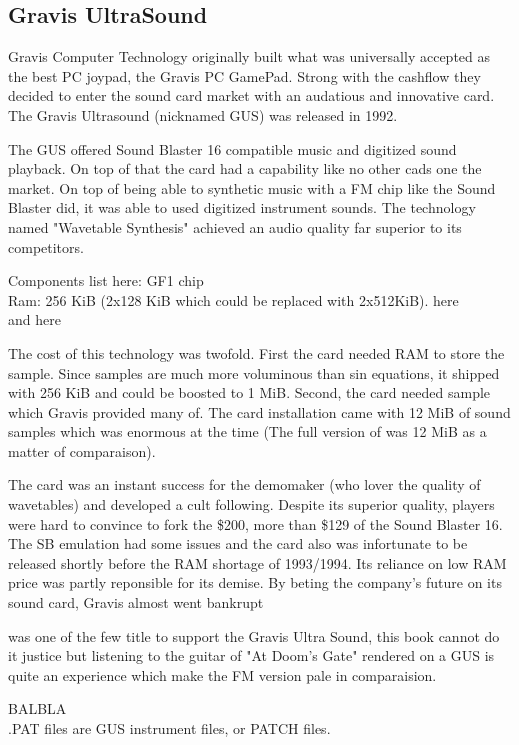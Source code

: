 \subsection{Gravis UltraSound}
Gravis Computer Technology originally built what was universally accepted as the best PC joypad, the Gravis PC GamePad. Strong with the cashflow they decided to enter the sound card market with an audatious and innovative card. The Gravis Ultrasound (nicknamed GUS) was released in 1992.\\
\par
The GUS offered Sound Blaster 16 compatible music and digitized sound playback. On top of that the card had a capability like no other cads one the market. On top of being able to synthetic music with a FM chip like the Sound Blaster did, it was able to used digitized instrument sounds. The technology named "Wavetable Synthesis" achieved an audio quality far superior to its competitors.\\
\par
{}
\par
Components list here: GF1 chip\\
Ram: 256 KiB (2x128 KiB which could be replaced with 2x512KiB). here\\
and here\\
\par
The cost of this technology was twofold. First the card needed RAM to store the sample. Since samples are much more voluminous than sin equations, it shipped with 256 KiB and could be boosted to 1 MiB. Second, the card needed sample which Gravis provided many of. The card installation came with 12 MiB of sound samples which was enormous at the time (The full version of \doom was 12 MiB as a matter of comparaison).\\
\par
The card was an instant success for the demomaker (who lover the quality of wavetables) and developed a cult following. Despite its superior quality, players were hard to convince to fork the \$200, more than \$129 of the Sound Blaster 16. The SB emulation had some issues and the card also was infortunate to be released shortly before the RAM shortage of 1993/1994. Its reliance on low RAM price was partly reponsible for its demise. By beting the company's future on its sound card, Gravis almost went bankrupt\\
\par
 \doom was one of the few title to support the Gravis Ultra Sound, this book cannot do it justice but listening to the guitar of  "At Doom's Gate" rendered on a GUS is quite an experience which make the FM version pale in comparaision.\\

\par
BALBLA\\
.PAT files are GUS instrument files, or PATCH files.